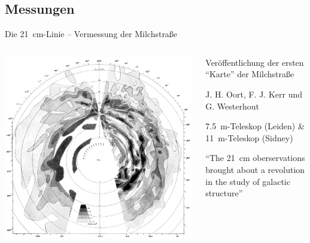 \subsection{Messungen}
\begin{frame}{Die \SI{21}{\centi\meter}-Linie – Vermessung der Milchstraße}%
  \begin{columns}[c, onlytextwidth]
    \begin{column}{0.47\textwidth}%
      \includegraphics[width=\textwidth, angle=180]{./images/original_map.png}%
    \end{column}%
    \begin{column}{0.47\textwidth}%
      \begin{description}[Messung]
        \item[1958] Veröffentlichung der ersten \enquote{Karte} der Milchstraße
        \item[Autoren] J. H. Oort, F. J. Kerr und G. Westerhout
        \item[Messung] \SI{7.5}{\meter}-Teleskop (Leiden) \&  \SI{11}{\meter}-Teleskop (Sidney)
      \end{description}

      \begin{center}
      \parbox{0.85\linewidth}{\enquote{The \SI{21}{\centi\meter} oberservations brought about a revolution in the study of galactic structure}}
      \end{center}
    \end{column}%
  \end{columns}
\end{frame}
